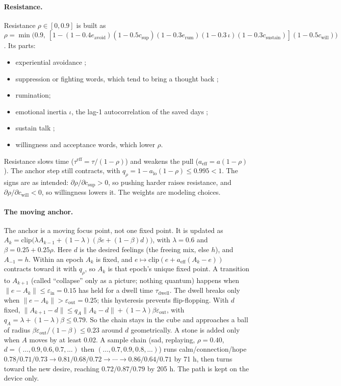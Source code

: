 \documentclass[10pt]{article}
\theoremstyle{remark}
\begin{document}
\paragraph{Resistance.} Resistance $\rho\in[0,0.9]$ is built as $\rho=\min\!\big(0.9,\ [1-(1-0.4e_{\mathrm{avoid}})(1-0.5c_{\mathrm{sup}})(1-0.3e_{\mathrm{rum}})(1-0.3\,\iota)(1-0.3c_{\mathrm{sustain}})](1-0.5c_{\mathrm{will}})\big)$. Its parts:
\begin{itemize}[itemsep=0pt]
\item experiential avoidance \citep{hayes2006,bond2011};
\item suppression or fighting words, which tend to bring a thought back \citep{wegner1987};
\item rumination;
\item emotional inertia $\iota$, the lag-1 autocorrelation of the saved days \citep{kuppens2010};
\item sustain talk \citep{millerrollnick2013};
\item willingness and acceptance words, which lower $\rho$.
\end{itemize}
Resistance slows time ($\tau^{\mathrm{eff}}=\tau/(1-\rho)$) and weakens the pull ($a_{\mathrm{eff}}=a(1-\rho)$). The anchor step still contracts, with $q_\rho=1-a_{\mathrm{lo}}(1-\rho)\le0.995<1$. The signs are as intended: $\partial\rho/\partial c_{\mathrm{sup}}>0$, so pushing harder raises resistance, and $\partial\rho/\partial c_{\mathrm{will}}<0$, so willingness lowers it. The weights are modeling choices.

\paragraph{The moving anchor.} The anchor is a moving focus point, not one fixed point. It is updated as $A_k=\mathrm{clip}\big(\lambda A_{k-1}+(1-\lambda)(\beta e+(1-\beta)d)\big)$, with $\lambda=0.6$ and $\beta=0.25+0.25\rho$. Here $d$ is the desired feelings (the freeing mix, else $h$), and $A_{-1}=h$. Within an epoch $A_k$ is fixed, and $e\mapsto\mathrm{clip}(e+a_{\mathrm{eff}}(A_k-e))$ contracts toward it with $q_\rho$, so $A_k$ is that epoch's unique fixed point. A transition to $A_{k+1}$ (called ``collapse'' only as a picture; nothing quantum) happens when $\|e-A_k\|\le\varepsilon_{\mathrm{in}}=0.15$ has held for a dwell time $\tau_{\mathrm{dwell}}$. The dwell breaks only when $\|e-A_k\|>\varepsilon_{\mathrm{out}}=0.25$; this hysteresis prevents flip-flopping. With $d$ fixed, $\|A_{k+1}-d\|\le q_A\|A_k-d\|+(1-\lambda)\beta\varepsilon_{\mathrm{out}}$, with $q_A=\lambda+(1-\lambda)\beta\le0.79$. So the chain stays in the cube and approaches a ball of radius $\beta\varepsilon_{\mathrm{out}}/(1-\beta)\le0.23$ around $d$ geometrically. A stone is added only when $A$ moves by at least 0.02. A sample chain (sad, replaying, $\rho=0.40$, $d=(\dots,0.9,0.6,0.7,\dots)$ then $(\dots,0.7,0.9,0.8,\dots)$) runs calm/connection/hope $0.78/0.71/0.73\to0.81/0.68/0.72\to\cdots\to0.86/0.64/0.71$ by 71 h, then turns toward the new desire, reaching $0.72/0.87/0.79$ by 205 h. The path is kept on the device only.
\end{document}
